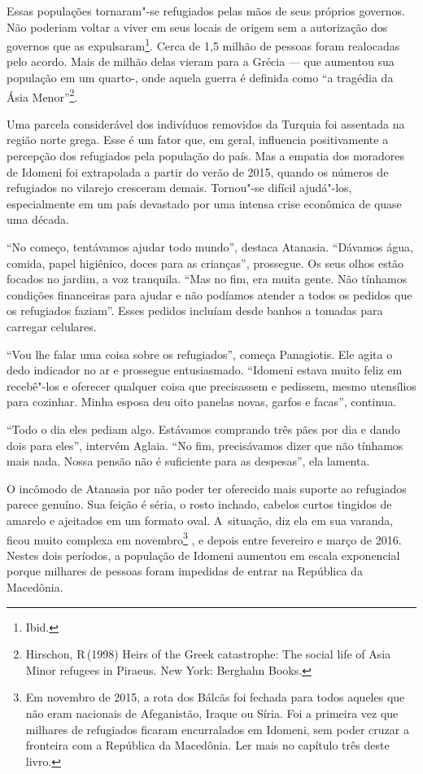 Essas populações tornaram"-se refugiados pelas mãos de seus próprios
governos. Não poderiam voltar a viver em seus locais de origem sem a
autorização dos governos que as expulsaram\footnote{ Ibid.}. Cerca
de 1,5 milhão de pessoas foram realocadas pelo acordo. Mais de milhão
delas vieram para a Grécia --- que aumentou sua população em um quarto-,
onde aquela guerra é definida como ``a tragédia da Ásia
Menor''\footnote{ Hirschon, R\,(1998) Heirs of the Greek
catastrophe: The social life of Asia Minor refugees in Piraeus. New
York: Berghahn Books.}.

Uma parcela considerável dos indivíduos removidos da Turquia foi
assentada na região norte grega. Esse é um fator que, em geral,
influencia positivamente a percepção dos refugiados pela população do
país. Mas a empatia dos moradores de Idomeni foi extrapolada a partir do
verão de 2015, quando os números de refugiados no vilarejo cresceram
demais. Tornou"-se difícil ajudá"-los, especialmente em um país devastado
por uma intensa crise econômica de quase uma década.

``No começo, tentávamos ajudar todo mundo'', destaca Atanasia. ``Dávamos
água, comida, papel higiênico, doces para as crianças'', prossegue.
Os seus olhos estão focados no jardim, a voz tranquila. ``Mas no fim, era
muita gente. Não tínhamos condições financeiras para ajudar e não
podíamos atender a todos os pedidos que os refugiados faziam''.
Esses pedidos incluíam desde banhos a tomadas para carregar celulares.

``Vou lhe falar uma coisa sobre os refugiados'', começa Panagiotis. Ele
agita o dedo indicador no ar e prossegue entusiasmado. ``Idomeni estava
muito feliz em recebê"-los e oferecer qualquer coisa que precisassem e
pedissem, mesmo utensílios para cozinhar. Minha esposa deu
oito panelas novas, garfos e facas'', continua.

``Todo o dia eles pediam algo. Estávamos comprando três pães por dia e
dando dois para eles'', intervém Aglaia. ``No fim, precisávamos dizer
que não tínhamos mais nada. Nossa pensão não é suficiente para as
despesas'', ela lamenta.

O incômodo de Atanasia por não poder ter oferecido mais suporte ao
refugiados parece genuíno. Sua feição é séria, o rosto inchado, cabelos
curtos tingidos de amarelo e ajeitados em um formato oval. A~situação,
diz ela em sua varanda, ficou muito complexa em
novembro\footnote{ Em novembro de 2015, a rota dos Bálcãs foi
fechada para todos aqueles que não eram nacionais de Afeganistão, Iraque
ou Síria. Foi a primeira vez que milhares de refugiados ficaram
encurralados em Idomeni, sem poder cruzar a fronteira com a República da
Macedônia. Ler mais no capítulo três deste livro.} , e depois entre fevereiro e março de
2016. Nestes dois períodos, a população de Idomeni aumentou em escala
exponencial porque milhares de pessoas foram impedidas de entrar na
República da Macedônia.
% 
% 
% 

